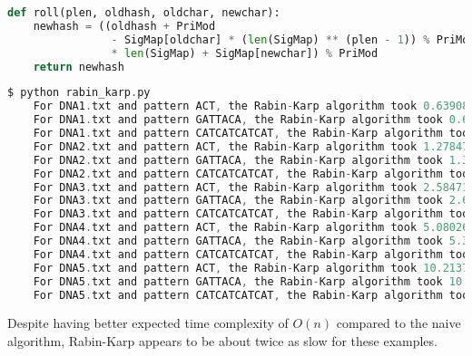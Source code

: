 \documentclass[12pt]{article}
\newenvironment{problem}[2][Problem]{\begin{trivlist}
\item[\hskip \labelsep {\bfseries #1}\hskip \labelsep {\bfseries #2.}]}{\end{trivlist}}
\begin{document}
\begin{problem}{2}
\begin{lstlisting}[language=Python, caption=Rabin-Karp algorithm]
def roll(plen, oldhash, oldchar, newchar):
    newhash = ((oldhash + PriMod 
                - SigMap[oldchar] * (len(SigMap) ** (plen - 1)) % PriMod) 
                * len(SigMap) + SigMap[newchar]) % PriMod
    return newhash
\end{lstlisting}
\pagebreak
\begin{lstlisting}[language=C, caption=Terminal output running code]
$ python rabin_karp.py 
    For DNA1.txt and pattern ACT, the Rabin-Karp algorithm took 0.639081138993788 seconds with 65495 matches
    For DNA1.txt and pattern GATTACA, the Rabin-Karp algorithm took 0.6668751739998697 seconds with 242 matches
    For DNA1.txt and pattern CATCATCATCAT, the Rabin-Karp algorithm took 0.7319347989978269 seconds with 0 matches
    For DNA2.txt and pattern ACT, the Rabin-Karp algorithm took 1.2784735669993097 seconds with 131034 matches
    For DNA2.txt and pattern GATTACA, the Rabin-Karp algorithm took 1.3436157860051026 seconds with 491 matches
    For DNA2.txt and pattern CATCATCATCAT, the Rabin-Karp algorithm took 1.4682704229999217 seconds with 1 matches
    For DNA3.txt and pattern ACT, the Rabin-Karp algorithm took 2.5847115970027517 seconds with 262192 matches
    For DNA3.txt and pattern GATTACA, the Rabin-Karp algorithm took 2.6529827709964593 seconds with 1002 matches
    For DNA3.txt and pattern CATCATCATCAT, the Rabin-Karp algorithm took 2.936001311005384 seconds with 1 matches
    For DNA4.txt and pattern ACT, the Rabin-Karp algorithm took 5.080261541996151 seconds with 524454 matches
    For DNA4.txt and pattern GATTACA, the Rabin-Karp algorithm took 5.316721924995363 seconds with 1976 matches
    For DNA4.txt and pattern CATCATCATCAT, the Rabin-Karp algorithm took 5.90457762600272 seconds with 5 matches
    For DNA5.txt and pattern ACT, the Rabin-Karp algorithm took 10.213705198999378 seconds with 1050689 matches
    For DNA5.txt and pattern GATTACA, the Rabin-Karp algorithm took 10.634073597997485 seconds with 4161 matches
    For DNA5.txt and pattern CATCATCATCAT, the Rabin-Karp algorithm took 11.496143873002438 seconds with 3 matches
\end{lstlisting}
Despite having better expected time complexity of $O(n)$ compared to the naive algorithm, Rabin-Karp appears to be about twice as slow for these examples.
\end{problem}
\end{document}
